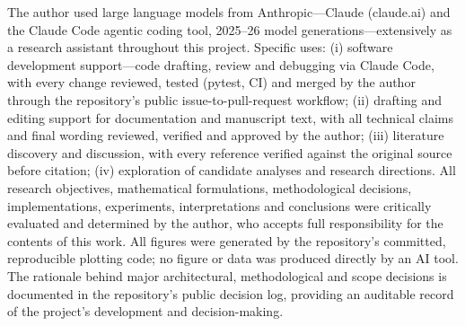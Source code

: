 \documentclass[11pt]{article}
\begin{document}
The author used large language models from Anthropic---Claude (claude.ai) and the Claude
Code agentic coding tool, 2025--26 model generations---extensively as a research assistant
throughout this project. Specific uses: (i) software development support---code drafting,
review and debugging via Claude Code, with every change reviewed, tested (pytest, CI) and
merged by the author through the repository's public issue-to-pull-request workflow;
(ii) drafting and editing support for documentation and manuscript text, with all technical
claims and final wording reviewed, verified and approved by the author; (iii) literature
discovery and discussion, with every reference verified against the original source before
citation; (iv) exploration of candidate analyses and research directions. All research
objectives, mathematical formulations, methodological decisions, implementations,
experiments, interpretations and conclusions were critically evaluated and determined by
the author, who accepts full responsibility for the contents of this work. All figures
were generated by the repository's committed, reproducible plotting code; no figure or
data was produced directly by an AI tool. The rationale behind major architectural,
methodological and scope decisions is documented in the repository's public decision log,
providing an auditable record of the project's development and decision-making.
\end{document}
